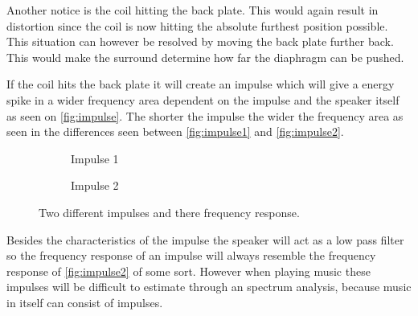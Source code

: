 
Another notice is the coil hitting the back plate. This would again result in distortion since the coil is now hitting the absolute furthest position possible. This situation can however be resolved by moving the back plate further back. This would make the surround determine how far the diaphragm can be pushed.

% 


If the coil hits the back plate it will create an impulse which will give a energy spike in a wider frequency area dependent on the impulse and the speaker itself as seen on \autoref{fig:impulse}. The shorter the impulse the wider the frequency area as seen in the differences seen between \autoref{fig:impulse1} and \autoref{fig:impulse2}.  

\begin{figure}[H]
\begin{subfigure}[t]{0.47\textwidth}
\centering
{}
\scalebox{0.6}{
}
\caption{Impulse 1}
\label{fig:impulse1}
\end{subfigure}
\hspace{6mm} 
\begin{subfigure}[t]{0.47\textwidth}
\centering
{}
\scalebox{0.6}{
}
\caption{Impulse 2}
\label{fig:impulse2}
\end{subfigure}
\caption{Two different impulses and there frequency response.}
\label{fig:impulse}
\end{figure}
Besides the characteristics of the impulse the speaker will act as a low pass filter so the frequency response of an impulse will always resemble the frequency response of \autoref{fig:impulse2} of some sort. However when playing music these impulses will be difficult to estimate through an spectrum analysis, because music in itself can consist of impulses.     



